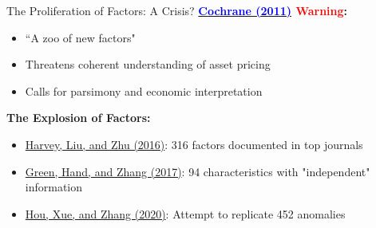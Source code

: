 \documentclass{beamer}
\begin{document}
\begin{frame}{The Proliferation of Factors: A Crisis?}
    \textbf{\href{https://onlinelibrary.wiley.com/doi/10.1111/j.1540-6261.2011.01671.x}{\textcolor{blue}{Cochrane (2011)}} \textcolor{red}{Warning}:}
    \begin{itemize}
        \item ``A zoo of new factors"
        \item Threatens coherent understanding of asset pricing
        \item Calls for parsimony and economic interpretation
    \end{itemize}

    \textbf{The Explosion of Factors:}
    \begin{itemize}
        \item \textcolor{blue}{\href{https://doi.org/10.1093/rfs/hhv059}{Harvey, Liu, and Zhu (2016)}}: 316 factors documented in top journals
        \item \textcolor{blue}{\href{https://academic.oup.com/rfs/article/30/12/4389/3091648}{Green, Hand, and Zhang (2017)}}: 94 characteristics with "independent" information
        \item \textcolor{blue}{\href{https://doi.org/10.1093/rfs/hhy131}{Hou, Xue, and Zhang (2020)}}: Attempt to replicate 452 anomalies
    \end{itemize}

\end{frame}
\end{document}
